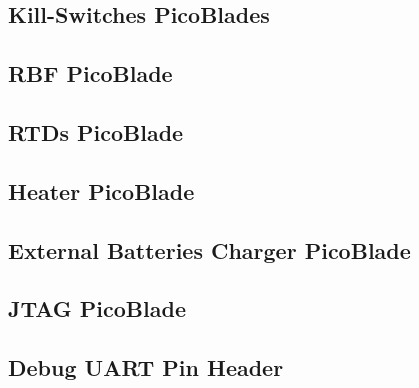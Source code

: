 \subsection{Kill-Switches PicoBlades}


\subsection{RBF PicoBlade}


\subsection{RTDs PicoBlade} \label{sec:rtd-picoblade}


\subsection{Heater PicoBlade} \label{sec:heater-picoblade}


\subsection{External Batteries Charger PicoBlade}


\subsection{JTAG PicoBlade}


\subsection{Debug UART Pin Header}
